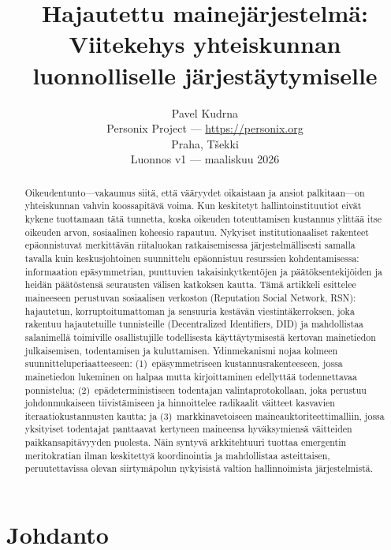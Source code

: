 \documentclass[11pt,a4paper,twocolumn]{article}
\title{\textbf{Hajautettu mainejärjestelmä:\\Viitekehys yhteiskunnan luonnolliselle järjestäytymiselle}}
\author{Pavel Kudrna\\Personix Project --- \url{https://personix.org}\\Praha, Tšekki\\Luonnos v1 --- maaliskuu 2026}
\date{}
\begin{document}
\maketitle

\begin{abstract}
Oikeudentunto---vakaumus siitä, että vääryydet oikaistaan ja ansiot palkitaan---on yhteiskunnan vahvin koossapitävä voima. Kun keskitetyt hallintoinstituutiot eivät kykene tuottamaan tätä tunnetta, koska oikeuden toteuttamisen kustannus ylittää itse oikeuden arvon, sosiaalinen koheesio rapautuu. Nykyiset institutionaaliset rakenteet epäonnistuvat merkittävän riitaluokan ratkaisemisessa järjestelmällisesti samalla tavalla kuin keskusjohtoinen suunnittelu epäonnistuu resurssien kohdentamisessa: informaation epäsymmetrian, puuttuvien takaisinkytkentöjen ja päätöksentekijöiden ja heidän päätöstensä seurausten välisen katkoksen kautta. Tämä artikkeli esittelee maineeseen perustuvan sosiaalisen verkoston (Reputation Social Network, RSN): hajautetun, korruptoitumattoman ja sensuuria kestävän viestintäkerroksen, joka rakentuu hajautetuille tunnisteille (Decentralized Identifiers, DID) ja mahdollistaa salanimellä toimiville osallistujille todellisesta käyttäytymisestä kertovan mainetiedon julkaisemisen, todentamisen ja kuluttamisen. Ydinmekanismi nojaa kolmeen suunnitteluperiaatteeseen: (1)~epäsymmetriseen kustannusrakenteeseen, jossa mainetiedon lukeminen on halpaa mutta kirjoittaminen edellyttää todennettavaa ponnistelua; (2)~epädeterministiseen todentajan valintaprotokollaan, joka perustuu johdonmukaiseen tiivistämiseen ja hinnoittelee radikaalit väitteet kasvavien iteraatiokustannusten kautta; ja (3)~markkinavetoiseen maineauktoriteettimalliin, jossa yksityiset todentajat panttaavat kertyneen maineensa hyväksymiensä väitteiden paikkansapitävyyden puolesta. Näin syntyvä arkkitehtuuri tuottaa emergentin meritokratian ilman keskitettyä koordinointia ja mahdollistaa asteittaisen, peruutettavissa olevan siirtymäpolun nykyisistä valtion hallinnoimista järjestelmistä.
\end{abstract}

\section{Johdanto}
\end{document}
